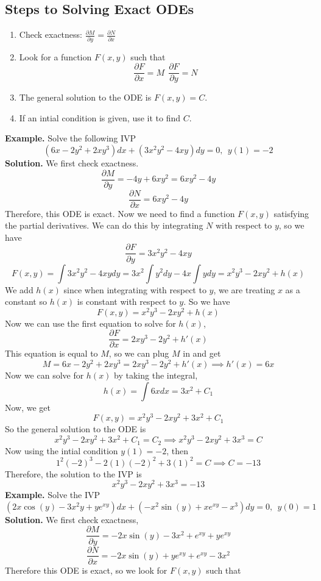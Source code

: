 \documentclass[openany]{report}
\begin{document}
\subsection{Steps to Solving Exact ODEs}
\begin{enumerate}
    \item Check exactness: $\frac{\partial M}{\partial y} = \frac{\partial N}{\partial x}$
    \item Look for a function $F(x,y)$ such that
    \[\frac{\partial F}{\partial x} = M \ \ \frac{\partial F}{\partial y} = N\]
    \item The general solution to the ODE is $F(x,y) = C$.
    \item If an intial condition is given, use it to find $C$.
\end{enumerate}
\textbf{Example.} Solve the following IVP
\[(6x - 2y^2 + 2xy^3)dx + (3x^2y^2 - 4xy)dy = 0, \ \ y(1) = -2\]
\textbf{Solution.} We first check exactness.
\[\frac{\partial M}{\partial y} = -4y + 6xy^2 = 6xy^2 - 4y\]
\[\frac{\partial N}{\partial x} = 6xy^2 - 4y\]
Therefore, this ODE is exact. Now we need to find a function $F(x,y)$ satisfying the partial derivatives. We can do this by integrating $N$ with respect to $y$, so we have 
\[\frac{\partial F}{\partial y} = 3x^2y^2 - 4xy\]
\[F(x,y) = \int 3x^2y^2-4xy dy = 3x^2 \int y^2dy - 4x \int ydy = x^2y^3 - 2xy^2 + h(x)\]
We add $h(x)$ since when integrating with respect to $y$, we are treating $x$ as a constant so $h(x)$ is constant with respect to $y$. So we have 
\[F(x,y) = x^2y^3 - 2xy^2 + h(x)\]
Now we can use the first equation to solve for $h(x)$, 
\[\frac{\partial F}{\partial x} = 2xy^3 - 2y^2 + h'(x)\]
This equation is equal to $M$, so we can plug $M$ in and get 
\[M = 6x-2y^2 + 2xy^3 = 2xy^3 - 2y^2 + h'(x) \implies h'(x) = 6x\]
Now we can solve for $h(x)$ by taking the integral, 
\[h(x) = \int 6xdx = 3x^2 + C_1\]
Now, we get 
\[F(x,y) = x^2y^3 - 2xy^2 + 3x^2 + C_1\]
So the general solution to the ODE is
\[x^2y^3 - 2xy^2 + 3x^2 + C_1 = C_2 \implies x^2y^3 - 2xy^2 + 3x^3 = C\]
Now using the intial condition $y(1) = - 2$, then 
\[1^2 (-2)^3 - 2(1)(-2)^2 + 3(1)^2 = C \implies C  = -13\]
Therefore, the solution to the IVP is 
\[x^2y^3 - 2xy^2 + 3x^3 = -13\]
\textbf{Example.} Solve the IVP 
\[(2x\cos(y) - 3x^2y + ye^{xy})dx + (-x^2\sin(y)+xe^{xy} - x^3)dy = 0, \ \ y(0) = 1 \]
\textbf{Solution.} We first check exactness,
\[\frac{\partial M}{\partial y} = -2x\sin(y) - 3x^2 + e^{xy} + ye^{xy}\]
\[\frac{\partial N}{\partial x} = -2x\sin(y) + ye^{xy} + e^{xy} -3x^2\]
Therefore this ODE is exact, so we look for $F(x,y)$ such that 
\end{document}
